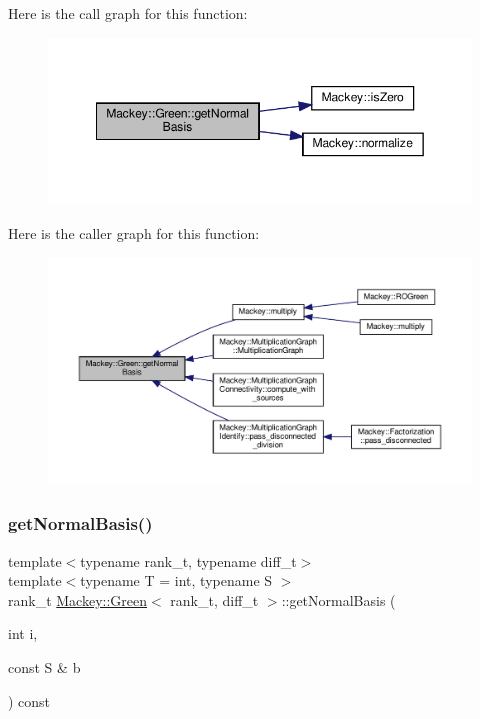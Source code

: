 Here is the call graph for this function\+:\nopagebreak
\begin{figure}[H]
\begin{center}
\leavevmode
\includegraphics[width=349pt]{classMackey_1_1Green_a35594da87192177ce4bb623ad1b30c84_cgraph}
\end{center}
\end{figure}
Here is the caller graph for this function\+:\nopagebreak
\begin{figure}[H]
\begin{center}
\leavevmode
\includegraphics[width=350pt]{classMackey_1_1Green_a35594da87192177ce4bb623ad1b30c84_icgraph}
\end{center}
\end{figure}
\mbox{\label{classMackey_1_1Green_a257e9f34318b5e2dbbe668b4e237a6c3}} 
\subsubsection{\texorpdfstring{get\+Normal\+Basis()}{getNormalBasis()}\hspace{0.1cm}{\footnotesize\ttfamily [2/4]}}
{\footnotesize\ttfamily template$<$typename rank\+\_\+t, typename diff\+\_\+t$>$ \\
template$<$typename T  = int, typename S $>$ \\
rank\+\_\+t \hyperlink{classMackey_1_1Green}{Mackey\+::\+Green}$<$ rank\+\_\+t, diff\+\_\+t $>$\+::get\+Normal\+Basis (\begin{DoxyParamCaption}\item[{int}]{i,  }\item[{const S \&}]{b }\end{DoxyParamCaption}) const\hspace{0.3cm}{\ttfamily [inline]}}



